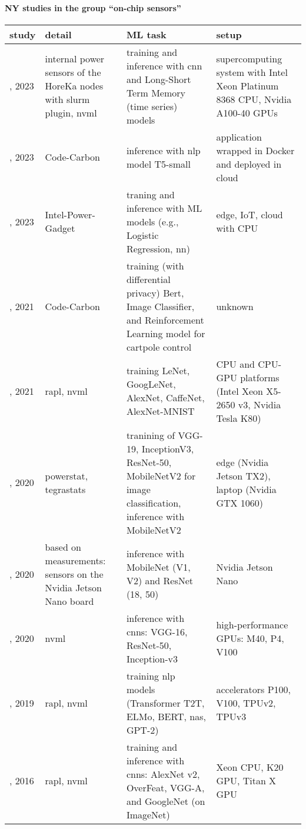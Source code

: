 \paragraph{NY studies in the group ``on-chip sensors''} 
 \label{tab:NY-on-chip-sensors} 
\begin{longtable}{|>{\raggedright\arraybackslash}p{0.85cm}|p{4cm}|p{6cm}|>{\raggedright\arraybackslash}p{3.75cm}|}
\toprule
\bfseries study & \bfseries detail & \bfseries ML task & \bfseries setup \\
\midrule 
\endhead
\cite{caspart2023}, 2023 & internal power sensors of the HoreKa nodes with slurm plugin, \acrshort{nvml} & training and inference with \acrshort{cnn} and Long-Short Term Memory (time series) models & supercomputing system with Intel Xeon Platinum 8368 CPU, Nvidia A100-40 GPUs \\
\cite{escribano2023}, 2023 & Code-Carbon & inference with \acrshort{nlp} model T5-small & application wrapped in Docker and deployed in cloud \\
\cite{tekin2023}, 2023 & Intel-Power-Gadget & traning and inference with ML models (e.g., Logistic Regression, \acrshort{nn}) & edge, IoT, cloud with CPU \\
\cite{naidu2021}, 2021 & Code-Carbon & training (with differential privacy) Bert, Image Classifier, and Reinforcement Learning model for cartpole control & unknown \\
\cite{sun2021}, 2021 & \acrshort{rapl}, \acrshort{nvml} & training LeNet, GoogLeNet, AlexNet, CaffeNet, AlexNet-MNIST & CPU and CPU-GPU platforms (Intel Xeon X5-2650 v3, Nvidia Tesla K80) \\
\cite{jurj2020}, 2020 & powerstat, tegrastats & tranining of VGG-19, InceptionV3, ResNet-50, MobileNetV2 for image classification, inference with MobileNetV2 & edge (Nvidia Jetson TX2), laptop (Nvidia GTX 1060) \\
\cite{holly2020}, 2020 & based on measurements: sensors on the Nvidia Jetson Nano board & inference with MobileNet (V1, V2) and ResNet (18, 50) & Nvidia Jetson Nano \\
\cite{yao2021}, 2020 & \acrshort{nvml} & inference with \acrshort{cnn}s: VGG-16, ResNet-50, Inception-v3 & high-performance GPUs: M40, P4, V100 \\
\cite{strubell2019}, 2019 & \acrshort{rapl}, \acrshort{nvml} & training \acrshort{nlp} models (Transformer T2T, ELMo, BERT, \acrshort{nas}, GPT-2) & accelerators P100, V100, TPUv2, TPUv3 \\
\cite{li2016a}, 2016 & \acrshort{rapl}, \acrshort{nvml} & training and inference with \acrshort{cnn}s: AlexNet v2, OverFeat, VGG-A, and GoogleNet (on ImageNet) & Xeon CPU, K20 GPU, Titan X GPU \\
\bottomrule
\end{longtable}

